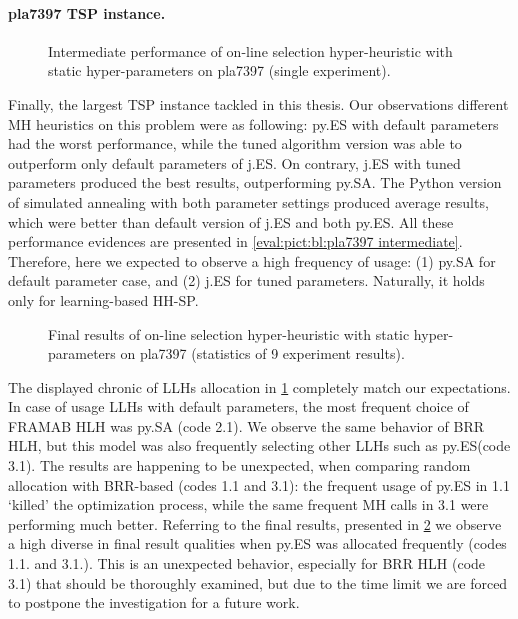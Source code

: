 \newpage
\paragraph{pla7397 TSP instance.}
\begin{figure}[t]
	\centering
	\vspace{-20pt}
	
	\caption{Intermediate performance of on-line selection hyper-heuristic with static hyper-parameters on pla7397 (single experiment).}
	\vspace{-10pt}
	\label{eval:pict:hh-sp:pla7397 intermediate}
\end{figure}
Finally, the largest TSP instance tackled in this thesis. Our observations different MH heuristics on this problem were as following: py.ES with default parameters had the worst performance, while the tuned algorithm version was able to outperform only default parameters of j.ES. On contrary, j.ES with tuned parameters produced the best results, outperforming py.SA. The Python version of simulated annealing with both parameter settings produced average results, which were better than default version of j.ES and both py.ES. All these performance evidences are presented in \cref{eval:pict:bl:pla7397 intermediate}. Therefore, here we expected to observe a high frequency of usage: (1) py.SA for default parameter case, and (2) j.ES for tuned parameters. Naturally, it holds only for learning-based HH-SP.


\begin{figure}[b]
	\centering
	\vspace{-20pt}
	
	\caption{Final results of on-line selection hyper-heuristic with static hyper-parameters on pla7397 (statistics of 9 experiment results).}
	\vspace{-5pt}
	\label{eval:pict:hh-sp:pla7397 final}
\end{figure}

The displayed chronic of LLHs allocation in \cref{eval:pict:hh-sp:pla7397 intermediate} completely match our expectations. In case of usage LLHs with default parameters, the most frequent choice of FRAMAB HLH was py.SA (code 2.1). We observe the same behavior of BRR HLH, but this model was also frequently selecting other LLHs such as py.ES(code 3.1). The results are happening to be unexpected, when comparing random allocation with BRR-based (codes 1.1 and 3.1): the frequent usage of py.ES in 1.1 `killed' the optimization process, while the same frequent MH calls in 3.1 were performing much better. Referring to the final results, presented in \cref{eval:pict:hh-sp:pla7397 final} we observe a high diverse in final result qualities when py.ES was allocated frequently (codes 1.1. and 3.1.). This is an unexpected behavior, especially for BRR HLH (code 3.1) that should be thoroughly examined, but due to the time limit we are forced to postpone the investigation for a future work.

